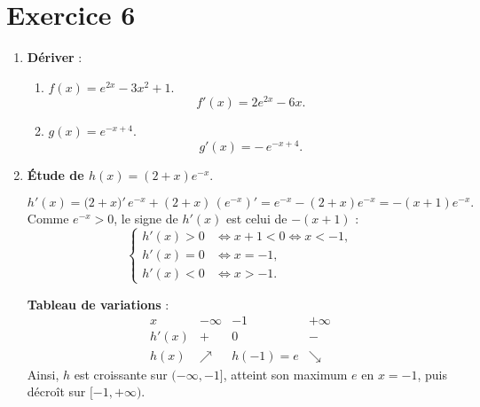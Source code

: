 \documentclass{article}
\theoremstyle{definition}
\begin{document}
\section*{Exercice 6}
\begin{enumerate}
  \item \textbf{Dériver} :
    \begin{enumerate}
      \item $f(x)=e^{2x}-3x^2+1$.
        \[
          f'(x) = 2e^{2x} -6x.
        \]

      \item $g(x)=e^{-x+4}$.
        \[
          g'(x) = -\,e^{-x+4}.
        \]
    \end{enumerate}

  \item \textbf{Étude de $h(x)=(2+x)e^{-x}$}.  

    \[
      h'(x) = \bigl(2+x\bigr)'\,e^{-x} + (2+x)\,(e^{-x})'
             = e^{-x} - (2+x)e^{-x}
             = -(x+1)e^{-x}.
    \]
    Comme $e^{-x}>0$, le signe de $h'(x)$ est celui de $-(x+1)$ :
    \[
      \begin{cases}
        h'(x)>0 &\iff x+1<0 \iff x<-1,\\
        h'(x)=0 &\iff x=-1,\\
        h'(x)<0 &\iff x>-1.
      \end{cases}
    \]
    \bigskip

    \noindent\textbf{Tableau de variations} :
    \[
      \begin{array}{c|ccc|c}
         x        & -\infty   &    -1      & +\infty \\ \hline
         h'(x)    &    +      &     0      &   -     \\ \hline
         h(x)     & \nearrow  & h(-1)=e   & \searrow
      \end{array}
    \]
    Ainsi, $h$ est croissante sur $(-\infty,-1]$, atteint son maximum $e$ en $x=-1$, puis décroît sur $[-1,+\infty)$.
\end{enumerate}
\end{document}
